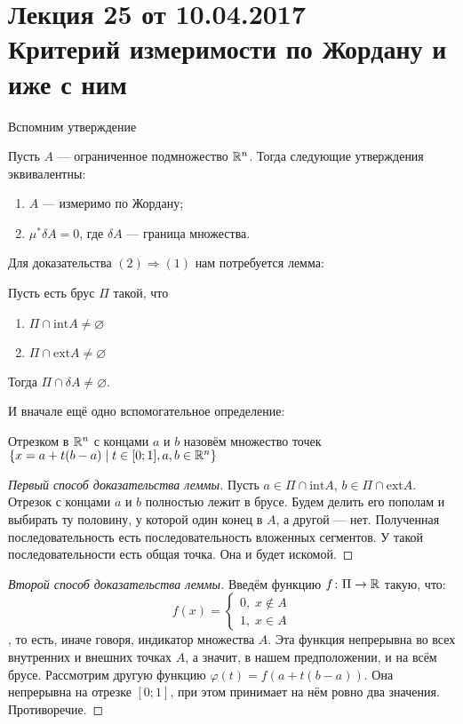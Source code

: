 \pagestyle{fancy}
\section{Лекция 25 от 10.04.2017 \\ Критерий измеримости по Жордану и иже с ним}

Вспомним утверждение
\begin{Statement}
Пусть $A$ --- ограниченное подмножество $\mathbb{R}^n$. Тогда следующие утверждения эквивалентны:
\begin{enumerate}
    \item $A$ --- измеримо по Жордану;
    \item $\mu^* \delta A = 0$, где $\delta A$ --- граница множества.
\end{enumerate}
\end{Statement}
Для доказательства $(2) \Rightarrow (1)$ нам потребуется лемма:
\begin{Lemma}
Пусть есть брус $\Pi$ такой, что
\begin{enumerate}
    \item $\Pi \cap \mathrm{int} A \neq \varnothing$
    \item $\Pi \cap \mathrm{ext} A \neq \varnothing$
\end{enumerate}
Тогда $\Pi \cap \delta A \neq \varnothing$.
\end{Lemma}
И вначале ещё одно вспомогательное определение:
\begin{Def}
Отрезком в $\mathbb{R}^n$ с концами $a$ и $b$ назовём множество точек $\{x = a + t(b-a)\;|\; t\in[0;1], a,b \in \mathbb{R}^n\}$
\end{Def}
\begin{proof} [Первый способ доказательства леммы]
    Пусть $a \in \Pi\cap \mathrm{int}A$, $b \in \Pi \cap \mathrm{ext}A$. Отрезок с концами $a$ и $b$ полностью лежит в брусе. Будем делить его пополам и выбирать ту половину, у которой один конец в $A$, а другой --- нет. Полученная последовательность есть последовательность вложенных сегментов. У такой последовательности есть общая точка. Она и будет искомой.
\end{proof}
\begin{proof}[Второй способ доказательства леммы]
Введём функцию $f\colon \Pi \to \mathbb{R}$ такую, что:
$$
    f(x) = \begin{cases}
        0,\; x\notin A\\
        1,\; x \in A
    \end{cases}
$$
, то есть, иначе говоря, индикатор множества $A$. Эта функция непрерывна во всех внутренних и внешних точках $A$, а значит, в нашем предположении, и на всём брусе. Рассмотрим другую функцию $\varphi(t) = f(a + t(b-a))$. Она непрерывна на отрезке $[0;1]$, при этом принимает на нём ровно два значения. Противоречие.
\end{proof}
